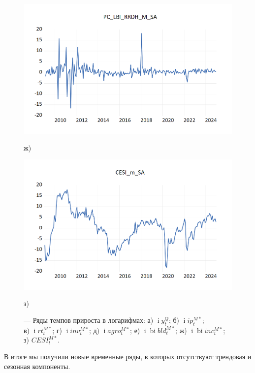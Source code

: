 \documentclass[a4paper, 14pt]{extreport}
\numberwithin{equation}{section}
\renewcommand{\i}{\operatorname{i}}
\newcommand{\bi}{\operatorname{bi}}
\numberwithin{equation}{section}
\begin{document}
\begin{figure}[h!]
		\begin{minipage}{0.5\textwidth}
			\centering
			\includegraphics[scale=0.4]{images/image28}
			\caption*{ж)}
		\end{minipage}%
		\hfill %
		\begin{minipage}{0.5\textwidth}
			\centering
			\includegraphics[scale=0.4]{images/image14}
			\caption*{з)}
		\end{minipage}
		
		\caption{\centering --- Ряды темпов прироста в логарифмах: а) $\i y_t^Q$; б) $\i ip_t^{M*}$;\\ в) $\i rt_t^{M*}$; г) $\i inv_t^{M*}$; д) $\i agro_t^{M*}$; е) $\i \bi bld_t^{M*}$; ж) $\i \bi inc_t^{M*}$; з) $CESI^{M*}_t$.}
		\label{fig:ts-3}
	\end{figure}
	
	В итоге мы получили новые временные ряды, в которых отсутствуют трендовая и сезонная компоненты. 
	
\end{document}
